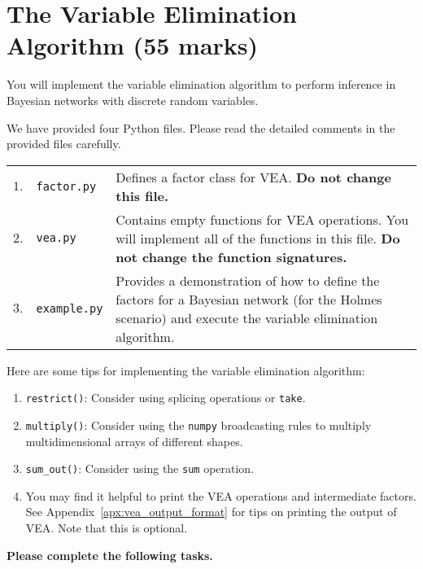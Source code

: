 \documentclass[12pt]{article}
\begin{document}
\section{The Variable Elimination Algorithm (55 marks)}

You will implement the variable elimination algorithm to perform inference in Bayesian networks with discrete random variables.

We have provided four Python files. Please read the detailed comments in the provided files carefully.

\begin{table}[ht!]
    \centering
    \begin{tabular}{llp{12cm}}
         $1.$ & \verb+factor.py+ & Defines a factor class for VEA. {\bf Do not change this file.} \\[5pt]
         $2.$ & \verb+vea.py+ & Contains empty functions for VEA operations. You will implement all of the functions in this file. {\bf Do not change the function signatures.} \\[5pt]
         $3.$ & \verb+example.py+ & Provides a demonstration of how to define the factors for a Bayesian network (for the Holmes scenario) and execute the variable elimination algorithm. \\
    \end{tabular}
    \label{tab:files_desc}
\end{table}


Here are some tips for implementing the variable elimination algorithm:

\begin{enumerate}
    \item \verb+restrict()+: Consider using splicing operations or \verb+take+.
    \item \verb+multiply()+: Consider using the \verb+numpy+ broadcasting rules to multiply multidimensional arrays of different shapes.
    \item \verb+sum_out()+: Consider using the \verb+sum+ operation.
    \item You may find it helpful to print the VEA operations and intermediate factors. See Appendix~\ref{apx:vea_output_format} for tips on printing the output of VEA. Note that this is optional.
\end{enumerate}


{\bf Please complete the following tasks.}
\end{document}
